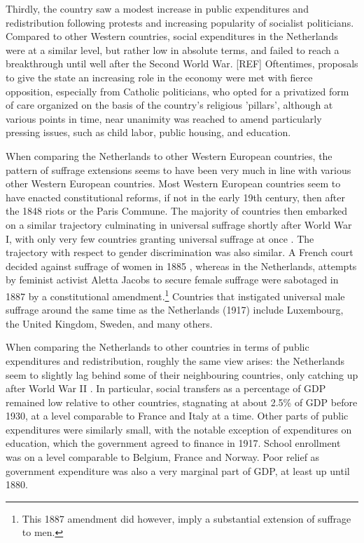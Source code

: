 Thirdly, the country saw a modest increase in public expenditures and redistribution following protests and increasing popularity of socialist politicians. Compared to other Western countries, social expenditures in the Netherlands were at a similar level, but rather low in absolute terms, and failed to reach a breakthrough until well after the Second World War. [REF] Oftentimes, proposals to give the state an increasing role in the economy were met with fierce opposition, especially from Catholic politicians, who opted for a privatized form of care organized on the basis of the country's religious 'pillars', although at various points in time, near unanimity was reached to amend particularly pressing issues, such as child labor, public housing, and education. \autocite{van2013eerste}

When comparing the Netherlands to other Western European countries,  the pattern of suffrage extensions seems to have been very much in line with various other Western European countries. Most Western European countries seem to have enacted constitutional reforms, if not in the early 19th century, then after the 1848 riots or the Paris Commune. The majority of countries then embarked on a similar trajectory culminating in universal suffrage shortly after World War I, with only very few countries granting universal suffrage at once \autocite{caramani2017elections}. The trajectory with respect to gender discrimination was also similar. A French court decided against suffrage of women in 1885 \autocite{przeworski2009conquered}, whereas in the Netherlands, attempts by feminist activist Aletta Jacobs to secure female suffrage were sabotaged in 1887 by a constitutional amendment.\footnote{This 1887 amendment did however, imply a substantial extension of suffrage to men.} Countries that instigated universal male suffrage around the same time as the Netherlands (1917) include Luxembourg, the United Kingdom, Sweden, and many others. \autocite{caramani2017elections}

When comparing the Netherlands to other countries in terms of public expenditures and redistribution, roughly the same view arises: the Netherlands seem to slightly lag behind some of their neighbouring countries, only catching up after World War II \autocite{lindert2004growing}. In particular, social transfers as a percentage of GDP remained low relative to other countries, stagnating at about 2.5\% of GDP before 1930, at a level comparable to France and Italy at a time. Other parts of public expenditures were similarly small, with the notable exception of expenditures on education, which the government agreed to finance in 1917. School enrollment was on a level comparable to Belgium, France and Norway. Poor relief as government expenditure was also a very marginal part of GDP, at least up until 1880. \autocite{van2000eenheiddstaat, lindert2004growing}

